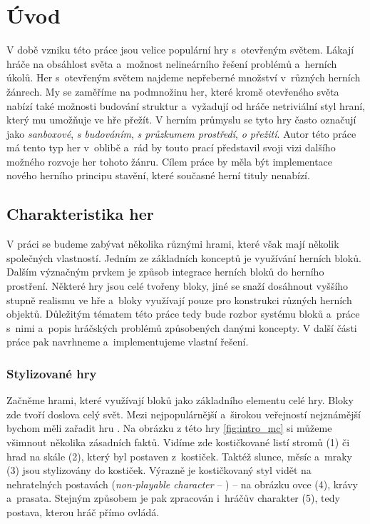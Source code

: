 
\chapter{Úvod}

V době vzniku této práce jsou velice populární hry s~otevřeným světem. Lákají hráče na obsáhlost světa a~možnost nelineárního řešení problémů a~herních úkolů. Her s~otevřeným světem najdeme nepřeberné množství v~různých herních žánrech. My se zaměříme na podmnožinu her, které kromě otevřeného světa nabízí také možnosti budování struktur a~vyžadují od hráče netriviální styl hraní, který mu umožňuje ve hře přežít. V herním průmyslu se tyto hry často označují jako \textit{sanboxové}, \textit{s budováním}, \textit{s průzkumem prostředí}, \textit{o přežití}. Autor této práce má tento typ her v~oblibě a~rád by touto prací představil svoji vizi dalšího možného rozvoje her tohoto žánru. Cílem práce by měla být implementace nového herního principu stavění, které současné herní tituly nenabízí.

\section{Charakteristika her}
V práci se budeme zabývat několika různými hrami, které však mají několik společných vlastností. Jedním ze základních konceptů je využívání herních bloků. Dalším význačným prvkem je způsob integrace herních bloků do herního prostření. Některé hry jsou celé tvořeny bloky, jiné se snaží dosáhnout vyššího stupně realismu ve hře a~bloky využívají pouze pro konstrukci různých herních objektů. Důležitým tématem této práce tedy bude rozbor systému bloků a~práce s~nimi a~popis hráčských problémů způsobených danými koncepty. V další části práce pak navrhneme a~implementujeme vlastní řešení.




\subsection{Stylizované hry}
Začněme hrami, které využívají bloků jako základního elementu celé hry. Bloky zde tvoří doslova celý svět. Mezi nejpopulárnější a~širokou veřejností nejznámější bychom měli zařadit hru \MC{}. Na obrázku z této hry \ref{fig:intro_mc} si můžeme všimnout několika zásadních faktů. Vidíme zde kostičkované listí stromů (1) či hrad na skále (2), který byl postaven z~kostiček. Taktéž slunce, měsíc a~mraky (3) jsou stylizovány do kostiček. Výrazně je kostičkovaný styl vidět na nehratelných postavách (\textit{non-playable character} -- \NPC{}) -- na obrázku ovce (4), krávy a~prasata. Stejným způsobem je pak zpracován i~hráčův charakter (5), tedy postava, kterou hráč přímo ovládá.

